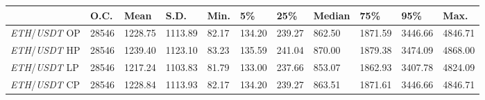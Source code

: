 \begin{tabular}{lllllllllll}
\toprule
 & \textbf{O.C.} & \textbf{Mean} & \textbf{S.D.} & \textbf{Min.} & \textbf{5\%} & \textbf{25\%} & \textbf{Median} & \textbf{75\%} & \textbf{95\%} & \textbf{Max.} \\
\midrule
\emph{ETH}/\emph{USDT} OP & 28546 & 1228.75 & 1113.89 & 82.17 & 134.20 & 239.27 & 862.50 & 1871.59 & 3446.66 & 4846.71 \\
\emph{ETH}/\emph{USDT} HP & 28546 & 1239.40 & 1123.10 & 83.23 & 135.59 & 241.04 & 870.00 & 1879.38 & 3474.09 & 4868.00 \\
\emph{ETH}/\emph{USDT} LP & 28546 & 1217.24 & 1103.83 & 81.79 & 133.00 & 237.66 & 853.07 & 1862.93 & 3407.78 & 4824.09 \\
\emph{ETH}/\emph{USDT} CP & 28546 & 1228.84 & 1113.93 & 82.17 & 134.20 & 239.27 & 863.51 & 1871.61 & 3446.66 & 4846.71 \\
\bottomrule
\end{tabular}
